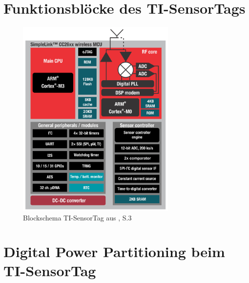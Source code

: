 \chapter{Funktionsblöcke des TI-SensorTags}
\label{anhang_sensortag} 

\begin{figure}[h]
    \includegraphics [width=0.7\textwidth]{7Anhang/imag/CC26xx_Block_Diagram.png} 
     \caption{Blockschema TI-SensorTag aus \cite{Sensortag_Datasheet}, S.3}
\end{figure}


%


\chapter{Digital Power Partitioning beim TI-SensorTag}
\label{anhang_sensortag_PowerDomain} 

